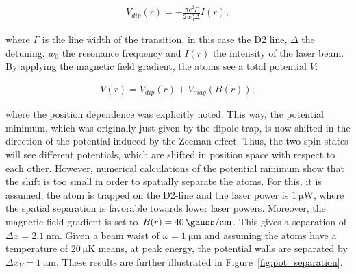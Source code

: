 \begin{align}
	V_{dip}(r) = -\frac{\pi c^2 \Gamma}{2 w_0^3 \Delta} I(r),
\end{align}

where $\Gamma$ is the line width of the transition, in this case the D2 line, $\Delta$ the detuning, $w_0$ the resonance frequency and $I(r)$ the intensity of the laser beam. By applying the magnetic field gradient, the atoms see a total potential $V$:

\begin{align}
	V(r) = V_{dip}(r) + V_{mag}(B(r)),
\end{align}

where the position dependence was explicitly noted. This way, the potential minimum, which was originally just given by the dipole trap, is now shifted in the direction of the potential induced by the Zeeman effect. Thus, the two spin states will see different potentials, which are shifted in position space with respect to each other. However, numerical calculations of the potential minimum show that the shift is too small in order to spatially separate the atoms. For this, it is assumed, the atom is trapped on the D2-line and the laser power is $\SI{1}{\micro\watt}$, where the spatial separation is favorable towards lower laser powers. Moreover, the magnetic field gradient is set to $B(r) = \SI{40}{\gauss\per\centi\meter}$. This gives a separation of $\Delta x = \SI{2.1}{\nano\meter}$. Given a beam waist of $\omega=\SI{1}{\micro\meter}$ and assuming the atoms have a temperature of $\SI{20}{\micro\kelvin}$ means, at peak energy, the potential walls are separated by $\Delta x_V = \SI{1}{\micro\meter}$.
These results are further illustrated in Figure~\ref{fig:pot_separation}.

\begin{figure}[t]%
\end{figure}

